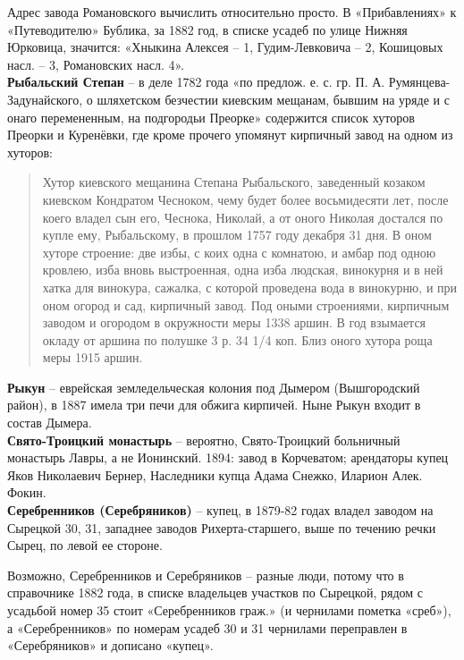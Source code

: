 Адрес завода Романовского вычислить относительно просто. В «Прибавлениях» к «Путеводителю» Бублика, за 1882 год, в списке усадеб по улице Нижняя Юрковица, значится: «Хныкина Алексея – 1, Гудим-Левковича – 2, Кошицовых насл. – 3, Романовских насл. 4».\\ 

\textbf{Рыбальский Степан} – в деле 1782 года «по предлож. е. с. гр. П. А. Румянцева-Задунайского, о шляхетском безчестии киевским мещанам, бывшим на уряде и с онаго перемененным, на подгородьи Преорке» содержится список хуторов Преорки и Куренёвки, где кроме прочего упомянут кирпичный завод на одном из хуторов:

\begin{quotation}
Хутор киевского мещанина Степана Рыбальского, заведенный козаком киевском Кондратом Чесноком, чему будет более восьмидесяти лет, после коего владел сын его, Чеснока, Николай, а от оного Николая достался по купле ему, Рыбальскому, в прошлом 1757 году декабря 31 дня. В оном хуторе строение: две избы, с коих одна с комнатою, и амбар под одною кровлею, изба вновь выстроенная, одна изба людская, винокурня и в ней хатка для винокура, сажалка, с которой проведена вода в винокурню, и при оном огород и сад, кирпичный завод. Под оными строениями, кирпичным заводом и огородом в окружности меры 1338 аршин. В год взымается окладу от аршина по полушке 3 р. 34 1/4 коп. Близ оного хутора роща меры 1915 аршин.
\end{quotation}

\noindent\textbf{Рыкун} – еврейская земледельческая колония под Дымером (Вышгородский район), в 1887 имела три печи для обжига кирпичей. Ныне Рыкун входит в состав Дымера.\\

\noindent\textbf{Свято-Троицкий монастырь} – вероятно, Свято-Троиц\-кий больничный монастырь Лавры, а не Ионинский. 1894: завод в Корчеватом; арендаторы купец Яков Николаевич Бернер, Наследники купца Адама Снежко, Иларион Алек. Фокин.\\

\noindent\textbf{Серебренников (Серебряников)} – купец, в 1879-82 годах владел заводом на Сырецкой 30, 31, западнее заводов Рихерта-старшего, выше по течению речки Сырец, по левой ее стороне.

Возможно, Серебренников и Серебряников – разные люди, потому что в справочнике 1882 года, в списке владельцев участков по Сырецкой, рядом с усадьбой номер 35 стоит «Серебренников граж.» (и чернилами пометка «среб»), а «Серебренников» по номерам усадеб 30 и 31 чернилами переправлен в «Серебряников» и дописано «купец».\\

